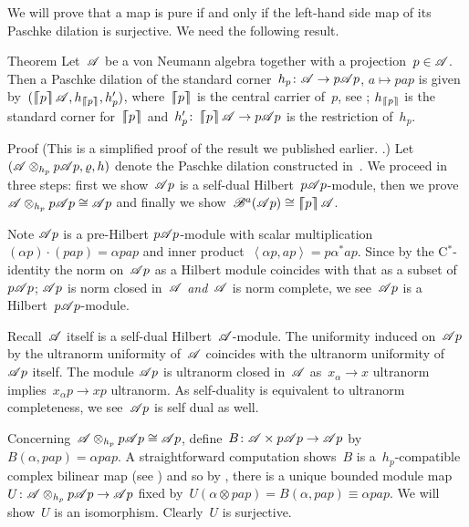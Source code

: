 \begin{parsec}%
\begin{point}%
We will prove that a map is pure if and only if
    the left-hand side map of its Paschke dilation
    is surjective.  We need the following result.
\end{point}
\begin{point}{Theorem}%
Let~$\mathscr{A}$ be a von Neumann algebra together with a projection~$p \in \mathscr{A}$.
Then a Paschke dilation of the standard corner~$h_p \colon \mathscr{A} \to p\mathscr{A} p$,
$a \mapsto pap$
is given by~$(\cceil{p}\scrA, h_{\cceil{p}}, h'_p)$,
    where~$\left\lceil\!\!\left\lceil p\right\rceil\!\!\right\rceil$ is the central  carrier of~$p$,
    see ;
    $h_{\left\lceil\!\!\left\lceil p\right\rceil\!\!\right\rceil}$ is the standard corner for~$\left\lceil\!\!\left\lceil p\right\rceil\!\!\right\rceil$
        and~$h'_p \colon \left\lceil\!\!\left\lceil p\right\rceil\!\!\right\rceil \mathscr{A} \to p\mathscr{A} p$
        is the restriction of~$h_p$.
\begin{point}{Proof}%
(This is a simplified proof of the result we published earlier.
    \cite[Thm.~28]{wwpaschke}.)
Let~$(\mathscr{A} \otimes_{h_p} p\mathscr{A} p, \varrho, h)$
    denote the Paschke dilation constructed in~.
We proceed in three steps:
    first we show~$\mathscr{A} p$ is a self-dual Hilbert~$p\mathscr{A} p$-module,
    then we prove~$\mathscr{A} \otimes_{h_p} p\mathscr{A} p \cong \mathscr{A} p$
    and finally we show~$\mathscr{B}^a(\mathscr{A} p) \cong \left\lceil\!\!\left\lceil p\right\rceil\!\!\right\rceil \mathscr{A}$.
\begin{point}%
Note $\mathscr{A} p$ is a pre-Hilbert $p \mathscr{A} p$-module
    with scalar multiplication~$(\alpha p)\cdot (pap) = \alpha pap$
    and inner product~$\left<\alpha p, ap\right> = p\alpha^*ap$.
Since by the C$^*$-identity the norm on~$\mathscr{A} p$
    as a Hilbert module coincides with that as a subset of~$p \mathscr{A} p$;
    $\mathscr{A} p$ is norm closed in~$\mathscr{A}$ \emph{and}~$\mathscr{A}$ is norm complete,
    we see~$\mathscr{A} p$ is a Hilbert~$p \mathscr{A} p$-module.

Recall~$\mathscr{A}$ itself is a self-dual Hilbert~$\mathscr{A}$-module.
The uniformity induced on~$\mathscr{A} p$ by the ultranorm uniformity
    of~$\mathscr{A}$ coincides with the ultranorm uniformity of~$\mathscr{A} p$ itself.
The module $\mathscr{A} p$ is ultranorm closed in~$\mathscr{A}$
    as~$x_\alpha \to x$ ultranorm
    implies~$x_\alpha p \to xp$ ultranorm.
As self-duality is equivalent to ultranorm completeness,
    we see~$\mathscr{A} p$ is self dual as well.
\end{point}
\begin{point}%
Concerning~$\mathscr{A} \otimes_{h_p} p \mathscr{A} p \cong \mathscr{A} p$,
    define~$B\colon \mathscr{A} \times  p \mathscr{A} p \to \mathscr{A} p$
    by~$B(\alpha, pap) = \alpha pap$.
A straightforward computation
    shows~$B$ is a~$h_p$-compatible complex bilinear map
    (see )
    and so by ,  there is a unique bounded module
    map~$U \colon \mathscr{A} \otimes_{h_p} p \mathscr{A} p \to \mathscr{A} p$
    fixed by~$U (\alpha \otimes pap) = B(\alpha,pap) \equiv \alpha pap $.
We will show~$U$ is an isomorphism.
   Clearly~$U$ is surjective.


\end{point}
\end{point}
\end{point}
\end{parsec}
